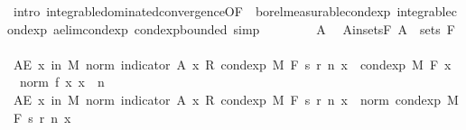 \begin{isabellebody}
\ {\isacharparenleft}{\kern0pt}intro\ integrable{\isacharunderscore}{\kern0pt}dominated{\isacharunderscore}{\kern0pt}convergence{\isacharbrackleft}{\kern0pt}OF\ {\isacharunderscore}{\kern0pt}\ borel{\isacharunderscore}{\kern0pt}measurable{\isacharunderscore}{\kern0pt}cond{\isacharunderscore}{\kern0pt}exp{\isacharprime}{\kern0pt}\ integrable{\isacharunderscore}{\kern0pt}cond{\isacharunderscore}{\kern0pt}exp\ ae{\isacharunderscore}{\kern0pt}lim{\isacharunderscore}{\kern0pt}cond{\isacharunderscore}{\kern0pt}exp\ cond{\isacharunderscore}{\kern0pt}exp{\isacharunderscore}{\kern0pt}bounded{\isacharbrackright}{\kern0pt}{\isacharcomma}{\kern0pt}\ simp{\isacharparenright}{\kern0pt}\isanewline
\isanewline
\ \ \isacommand{{\isacharbraceleft}{\kern0pt}}\isamarkupfalse%
\isanewline
\ \ \ \ \isamarkupfalse%
\ A\ \isamarkupfalse%
\ A{\isacharunderscore}{\kern0pt}in{\isacharunderscore}{\kern0pt}sets{\isacharunderscore}{\kern0pt}F{\isacharcolon}{\kern0pt}\ {\isachardoublequoteopen}A\ {\isasymin}\ sets\ F{\isachardoublequoteclose}\isanewline
\ \ \ \ \isamarkupfalse%
\ {\isachardoublequoteopen}AE\ x\ in\ M{\isachardot}{\kern0pt}\ norm\ {\isacharparenleft}{\kern0pt}indicator\ A\ x\ {\isacharasterisk}{\kern0pt}\isactrlsub R\ cond{\isacharunderscore}{\kern0pt}exp\ M\ F\ {\isacharparenleft}{\kern0pt}s\ {\isacharparenleft}{\kern0pt}r\ n{\isacharparenright}{\kern0pt}{\isacharparenright}{\kern0pt}\ x{\isacharparenright}{\kern0pt}\ {\isasymle}\ cond{\isacharunderscore}{\kern0pt}exp\ M\ F\ {\isacharparenleft}{\kern0pt}{\isasymlambda}x{\isachardot}{\kern0pt}\ {}\ {\isacharasterisk}{\kern0pt}\ norm\ {\isacharparenleft}{\kern0pt}f\ x{\isacharparenright}{\kern0pt}{\isacharparenright}{\kern0pt}\ x{\isachardoublequoteclose}\ \ n\isanewline
\ \ \ \ \isamarkupfalse%
\ {\isacharminus}{\kern0pt}\isanewline
\ \ \ \ \ \ \isamarkupfalse%
\ {\isachardoublequoteopen}AE\ x\ in\ M{\isachardot}{\kern0pt}\ norm\ {\isacharparenleft}{\kern0pt}indicator\ A\ x\ {\isacharasterisk}{\kern0pt}\isactrlsub R\ cond{\isacharunderscore}{\kern0pt}exp\ M\ F\ {\isacharparenleft}{\kern0pt}s\ {\isacharparenleft}{\kern0pt}r\ n{\isacharparenright}{\kern0pt}{\isacharparenright}{\kern0pt}\ x{\isacharparenright}{\kern0pt}\ {\isasymle}\ norm\ {\isacharparenleft}{\kern0pt}cond{\isacharunderscore}{\kern0pt}exp\ M\ F\ {\isacharparenleft}{\kern0pt}s\ {\isacharparenleft}{\kern0pt}r\ n{\isacharparenright}{\kern0pt}{\isacharparenright}{\kern0pt}\ x{\isacharparenright}{\kern0pt}{\isachardoublequoteclose}\ \isamarkupfalse%

\end{isabellebody}
